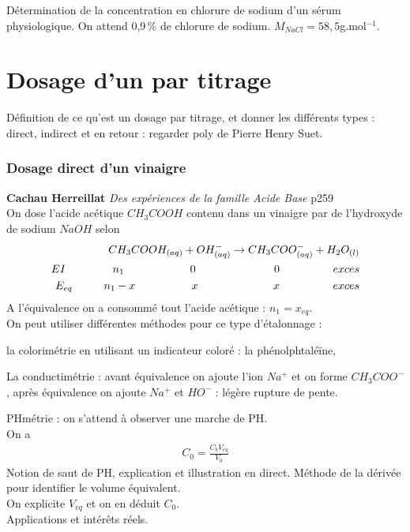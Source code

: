 \documentclass[12pt,prb,aps,epsf]{article}
\begin{document}
 Détermination de la concentration en chlorure de sodium d'un sérum physiologique. On attend 0,9\,\% de chlorure de sodium. $M_{NaCl} = 58,5$g.mol$^{-1}$.
 
 \section{Dosage d'un par titrage}
 Définition de ce qu'est un dosage par titrage, et donner les différents types : direct, indirect et en retour : regarder poly de Pierre Henry Suet.
 
 \subsubsection{Dosage direct d'un vinaigre}
 \textbf{Cachau Herreillat} \textit{Des expériences de la famille Acide Base} p259\\
 
 On dose l'acide acétique $CH_3COOH$ contenu dans un vinaigre par de l'hydroxyde de sodium $NaOH$ selon
 \begin{eqnarray}
 CH_3COOH_{(aq)} + OH^-_{(aq)} \rightarrow CH_3COO^-_{(aq)} + H_2O_{(l)} \\
 EI \hspace{1.5cm}n_1\hspace{2.1cm}0\hspace{2.5cm}0\hspace{1.7cm}exces\\
 E_{eq}\hspace{1.0cm}n_1-x\hspace{1.8cm}x\hspace{2.4cm}x\hspace{1.7cm}exces
 \end{eqnarray}
 A l'équivalence on a consommé tout l'acide acétique : $n_1=x_{eq}$.\\
 On peut utiliser différentes méthodes pour ce type d'étalonnage :
 
 la colorimétrie en utilisant un indicateur coloré : la phénolphtaléïne,
 
 La conductimétrie : avant équivalence on ajoute l'ion $Na^+$ et on forme $CH_3COO^-$, après équivalence on ajoute $Na^+$ et $HO^-$ : légère rupture de pente. 
 
 PHmétrie : on s'attend à observer une marche de PH.\\
 On a 
 \begin{eqnarray}
 C_0 = \frac{C_{b}V_{eq}}{V_0}
 \end{eqnarray}
 Notion de saut de PH, explication et illustration en direct. Méthode de la dérivée pour identifier le volume équivalent.\\
 On explicite $V_{eq}$ et on en déduit $C_0$.\\
 Applications et intérêts réels.
 
\end{document}
